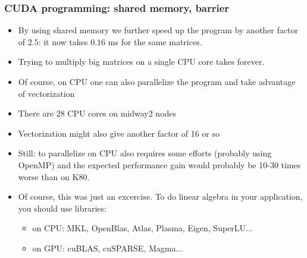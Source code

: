 \begin{frame}[fragile]
  \frametitle{CUDA programming: shared memory, barrier}
\begin{itemize}
\item By using shared memory we further speed up the program by another factor of $2.5$: it now takes $0.16$ ms for the same matrices.
\item Trying to multiply big matrices on a single CPU core takes forever. 
\item Of course, on CPU one can also parallelize the program and take advantage of vectorization
\item There are 28 CPU cores on midway2 nodes
\item Vectorization might also give another factor of 16 or so
\item Still: to parallelize on CPU also requires some efforts (probably using OpenMP) and the expected performance gain would probably be 10-30 times worse than on K80.
\item Of course, this was just an excercise. To do linear algebra in your application, you should use libraries:
  \begin{itemize}
  \item on CPU: MKL, OpenBlas, Atlas, Plasma, Eigen, SuperLU...
  \item on GPU: cuBLAS, cuSPARSE, Magma...
  \end{itemize}
\end{itemize}
\end{frame}
